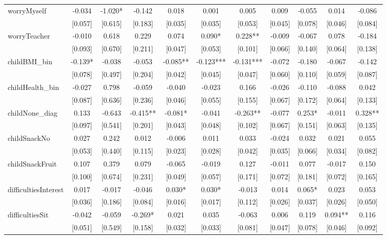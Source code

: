 \documentclass[12pt]{article}
\begin{document}
\begin{table}[ht]
\begin{center}
\begin{adjustbox}{width=1.2\textwidth,center=\textwidth}
\begin{tabular}{l*{10}{c}}
worryMyself & -0.034 & -1.020* & -0.142 & 0.018 & 0.001 & 0.005 & 0.009 & -0.055 & 0.014 & -0.086 \\
 & [0.057] & [0.615] & [0.183] & [0.035] & [0.035] & [0.053] & [0.045] & [0.078] & [0.046] & [0.084] \\
worryTeacher & -0.010 & 0.618 & 0.229 & 0.074 & 0.090* & 0.228** & -0.009 & -0.067 & 0.078 & -0.184 \\
 & [0.093] & [0.670] & [0.211] & [0.047] & [0.053] & [0.101] & [0.066] & [0.140] & [0.064] & [0.138] \\
childBMI\_bin & -0.139* & -0.038 & -0.053 & -0.085** & -0.123*** & -0.131*** & -0.072 & -0.180 & -0.067 & -0.142 \\
 & [0.078] & [0.497] & [0.204] & [0.042] & [0.045] & [0.047] & [0.060] & [0.110] & [0.059] & [0.087] \\
childHealth\_bin & -0.027 & 0.798 & -0.059 & -0.040 & -0.023 & 0.166 & -0.026 & -0.110 & -0.088 & 0.042 \\
 & [0.087] & [0.636] & [0.236] & [0.046] & [0.055] & [0.155] & [0.067] & [0.172] & [0.064] & [0.133] \\
childNone\_diag & 0.133 & -0.643 & -0.415** & -0.081* & -0.041 & -0.263** & -0.077 & 0.253* & -0.011 & 0.328** \\
 & [0.097] & [0.541] & [0.201] & [0.043] & [0.048] & [0.102] & [0.067] & [0.151] & [0.063] & [0.135] \\
childSnackNo & 0.027 & 0.242 & 0.012 & -0.006 & 0.011 & 0.033 & -0.024 & 0.032 & 0.021 & 0.055 \\
 & [0.053] & [0.440] & [0.115] & [0.023] & [0.028] & [0.042] & [0.035] & [0.066] & [0.034] & [0.082] \\
childSnackFruit & 0.107 & 0.379 & 0.079 & -0.065 & -0.019 & 0.127 & -0.011 & 0.077 & -0.017 & 0.150 \\
 & [0.100] & [0.674] & [0.231] & [0.049] & [0.057] & [0.171] & [0.072] & [0.181] & [0.072] & [0.165] \\
difficultiesInterest & 0.017 & -0.017 & -0.046 & 0.030* & 0.030* & -0.013 & 0.014 & 0.065* & 0.023 & 0.053 \\
 & [0.036] & [0.186] & [0.084] & [0.016] & [0.017] & [0.112] & [0.026] & [0.037] & [0.026] & [0.050] \\
difficultiesSit & -0.042 & -0.059 & -0.269* & 0.021 & 0.035 & -0.063 & 0.006 & 0.119 & 0.094** & 0.116 \\
 & [0.051] & [0.549] & [0.158] & [0.032] & [0.033] & [0.081] & [0.047] & [0.078] & [0.046] & [0.092] \\

\end{tabular}
\end{adjustbox}
\end{center}
\end{table}
\end{document}
